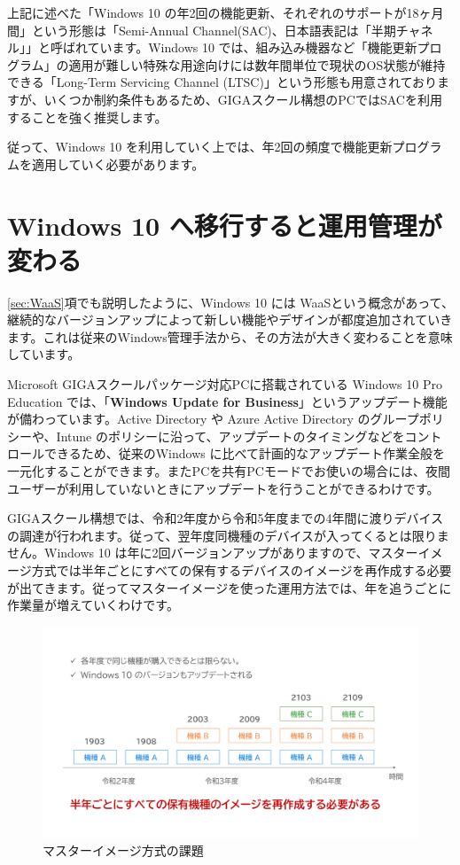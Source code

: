上記に述べた「Windows 10 の年2回の機能更新、それぞれのサポートが18ヶ月間」という形態は「Semi-Annual Channel(SAC)、日本語表記は「半期チャネル」」と呼ばれています。Windows 10 では、組み込み機器など「機能更新プログラム」の適用が難しい特殊な用途向けには数年間単位で現状のOS状態が維持できる「Long-Term Servicing Channel (LTSC)」という形態も用意されておりますが、いくつか制約条件もあるため、GIGAスクール構想のPCではSACを利用することを強く推奨します。

従って、Windows 10 を利用していく上では、年2回の頻度で機能更新プログラムを適用していく必要があります。

\section{Windows 10 へ移行すると運用管理が変わる}
\label{sec:Win10の運用}

\ref{sec:WaaS}項でも説明したように、Windows 10 には WaaSという概念があって、継続的なバージョンアップによって新しい機能やデザインが都度追加されていきます。これは従来のWindows管理手法から、その方法が大きく変わることを意味しています。

Microsoft GIGAスクールパッケージ対応PCに搭載されている Windows 10 Pro Education では、「\textbf{Windows Update for Business}」というアップデート機能が備わっています。Active Directory や Azure Active Directory のグループポリシーや、Intune のポリシーに沿って、アップデートのタイミングなどをコントロールできるため、従来のWindows に比べて計画的なアップデート作業全般を一元化することができます。またPCを共有PCモードでお使いの場合には、夜間ユーザーが利用していないときにアップデートを行うことができるわけです。

GIGAスクール構想では、令和2年度から令和5年度までの4年間に渡りデバイスの調達が行われます。従って、翌年度同機種のデバイスが入ってくるとは限りません。Windows 10 は年に2回バージョンアップがありますので、マスターイメージ方式では半年ごとにすべての保有するデバイスのイメージを再作成する必要が出てきます。従ってマスターイメージを使った運用方法では、年を追うごとに作業量が増えていくわけです。

\begin{figure}[htbp]
    \centering
    \includegraphics[width=14cm]{figures/MasterImage2.png}
    \caption{マスターイメージ方式の課題}
    \label{fig:MasterImage2}
\end{figure}

